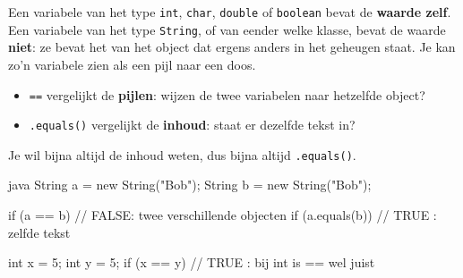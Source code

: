 \documentclass[a4paper,11pt]{article}
\begin{document}
Een variabele van het type \texttt{int}, \texttt{char}, \texttt{double} of
\texttt{boolean} bevat de \textbf{waarde zelf}. Een variabele van het type
\texttt{String}, of van eender welke klasse, bevat de waarde \textbf{niet}: ze
bevat het  van het object dat ergens anders in het geheugen staat.
Je kan zo'n variabele zien als een pijl naar een doos.

\begin{center}
\end{center}

\begin{itemize}
    \item \texttt{==} vergelijkt de \textbf{pijlen}: wijzen de twee variabelen
          naar hetzelfde object?
    \item \texttt{.equals()} vergelijkt de \textbf{inhoud}: staat er dezelfde
          tekst in?
\end{itemize}

Je wil bijna altijd de inhoud weten, dus bijna altijd \texttt{.equals()}.

\begin{codeblock}[== of equals]{java}
    String a = new String("Bob");
    String b = new String("Bob");

    if (a == b)      { }   // FALSE: twee verschillende objecten
    if (a.equals(b)) { }   // TRUE : zelfde tekst

    int x = 5;
    int y = 5;
    if (x == y)      { }   // TRUE : bij int is == wel juist
\end{codeblock}
\end{document}
